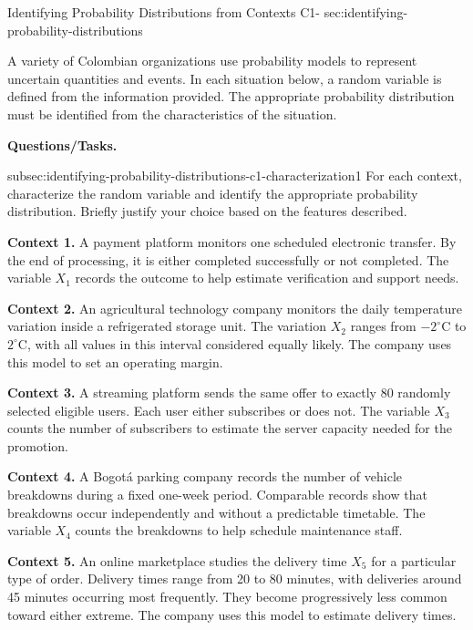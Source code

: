 	\sectionScored
	{Identifying Probability Distributions from Contexts}
	{C1-}
	{sec:identifying-probability-distributions}
	{
		A variety of Colombian organizations use probability models to represent uncertain quantities and events. In each situation below, a random variable is defined from the information provided. The appropriate probability distribution must be identified from the characteristics of the situation.
		
		\textbf{Questions/Tasks.}
		\begin{enumerate}
			\CriterionTask
			{subsec:identifying-probability-distributions-c1-characterization}{1}
			{For each context, characterize the random variable and identify the appropriate probability distribution. Briefly justify your choice based on the features described. }
		\end{enumerate}
		
		\textbf{Context 1.} A payment platform monitors one scheduled electronic transfer. By the end of processing, it is either completed successfully or not completed. The variable \(X_1\) records the outcome to help estimate verification and support needs.
		
		\textbf{Context 2.} An agricultural technology company monitors the daily temperature variation inside a refrigerated storage unit. The variation \(X_2\) ranges from \(-2^\circ\mathrm{C}\) to \(2^\circ\mathrm{C}\), with all values in this interval considered equally likely. The company uses this model to set an operating margin.
		
		\textbf{Context 3.} A streaming platform sends the same offer to exactly 80 randomly selected eligible users. Each user either subscribes or does not. The variable \(X_3\) counts the number of subscribers to estimate the server capacity needed for the promotion.
		
		\textbf{Context 4.} A Bogotá parking company records the number of vehicle breakdowns during a fixed one-week period. Comparable records show that breakdowns occur independently and without a predictable timetable. The variable \(X_4\) counts the breakdowns to help schedule maintenance staff.
		
		\textbf{Context 5.} An online marketplace studies the delivery time \(X_5\) for a particular type of order. Delivery times range from 20 to 80 minutes, with deliveries around 45 minutes occurring most frequently. They become progressively less common toward either extreme. The company uses this model to estimate delivery times.
		
}
